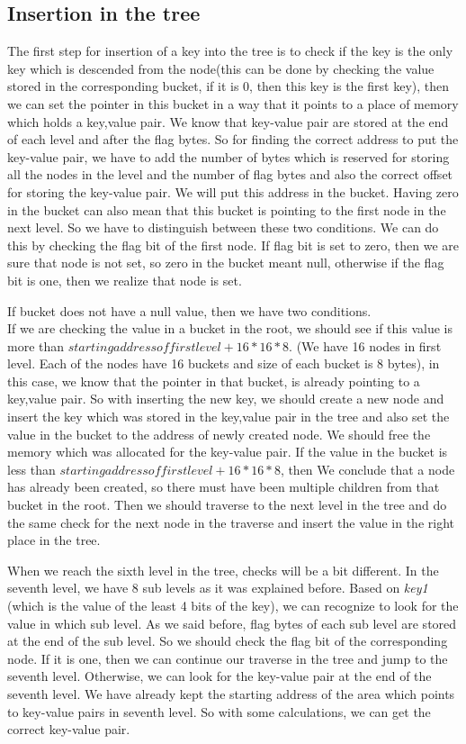\documentclass{report}
\begin{document}
\subsection{Insertion in the tree}
 The first step for insertion of a key into the tree is to check if the key is the only key which is descended from the node(this can be done by checking the value stored in the corresponding bucket, if it is 0, then this key is the first key), then we can set the pointer in this bucket in a way that it points to a place of memory which holds a key,value pair. We know that key-value pair are stored at the end of each level and after the flag bytes. So for finding the correct address to put the key-value pair, we have to add the number of bytes which is reserved for storing all the nodes in the level and the number of flag bytes and also the correct offset for storing the key-value pair. We will put this address in the bucket. Having zero in the bucket can also mean that this bucket is pointing to the first node in the next level. So we have to distinguish between these two conditions. We can do this by checking the flag bit of the first node. If flag bit is set to zero, then we are sure that node is not set, so zero in the bucket meant null, otherwise if the flag bit is one, then we realize that node is set.
 
 If  bucket does not have a null value, then we have two conditions.\\
If we are checking the value in a bucket in the root, we should see if this value is more than $starting address of firstlevel+16*16*8$. (We have 16 nodes in first level. Each of the nodes have 16 buckets and size of each bucket is 8 bytes), in this case, we know that the pointer in that bucket, is already pointing to a key,value pair. So with inserting the new key, we should create a new node and insert the key which was stored in the key,value pair in the tree and also set the value in the bucket to the address of newly created node. We should free the memory which was allocated for the key-value pair. If the value in the bucket is less than $starting address of firstlevel+16*16*8$, then We conclude that a node has already been created, so there must have been multiple children from that bucket in the root. Then we should traverse to the next level in the tree and do the same check for the next node in the traverse and insert the value in the right place in the tree.

When we reach the sixth level in the tree, checks will be a bit different. In the seventh level, we have 8 sub levels as it was explained before. Based on \textit{key1} (which is the value of the least 4 bits of the key), we can recognize to look for the value in which sub level. As we said before, flag bytes of each sub level are stored at the end of the sub level. So we should check the flag bit of the corresponding node. If it is one, then we can continue our traverse in the tree and jump to the seventh level. Otherwise, we can look for the key-value pair at the end of the seventh level. We have already kept the starting address of the area which points to key-value pairs in seventh level. So with some calculations, we can get the correct key-value pair.          
\end{document}
